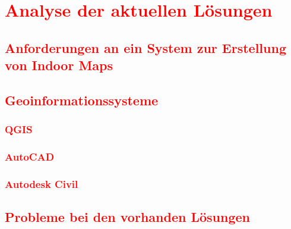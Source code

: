 \chapter{\textcolor{red}{Analyse der aktuellen Lösungen}}
\label{ch:analysis}

\section{\textcolor{red}{Anforderungen an ein System zur Erstellung von Indoor Maps}}

\section{\textcolor{red}{Geoinformationssysteme}}
\subsection{\textcolor{red}{QGIS}}
\subsection{\textcolor{red}{AutoCAD}}
\subsection{\textcolor{red}{Autodesk Civil}}

\section{\textcolor{red}{Probleme bei den vorhanden Lösungen}}
